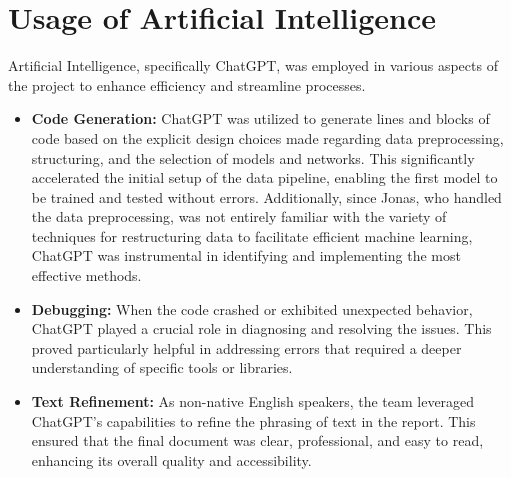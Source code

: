 \documentclass[conference,9pt]{IEEEtran}
\begin{document}
\section{Usage of Artificial Intelligence}
Artificial Intelligence, specifically ChatGPT, was employed in various aspects of the project to enhance efficiency and streamline processes.

\begin{itemize}
\item \textbf{Code Generation:} ChatGPT was utilized to generate lines and blocks of code based on the explicit design choices made regarding data preprocessing, structuring, and the selection of models and networks. This significantly accelerated the initial setup of the data pipeline, enabling the first model to be trained and tested without errors. Additionally, since Jonas, who handled the data preprocessing, was not entirely familiar with the variety of techniques for restructuring data to facilitate efficient machine learning, ChatGPT was instrumental in identifying and implementing the most effective methods.

\item \textbf{Debugging:} When the code crashed or exhibited unexpected behavior, ChatGPT played a crucial role in diagnosing and resolving the issues. This proved particularly helpful in addressing errors that required a deeper understanding of specific tools or libraries.

\item \textbf{Text Refinement:} As non-native English speakers, the team leveraged ChatGPT's capabilities to refine the phrasing of text in the report. This ensured that the final document was clear, professional, and easy to read, enhancing its overall quality and accessibility.
\end{itemize}
\end{document}
